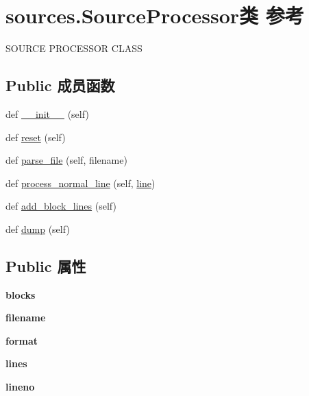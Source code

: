 \hypertarget{classsources_1_1_source_processor}{}\section{sources.\+Source\+Processor类 参考}
\label{classsources_1_1_source_processor}


S\+O\+U\+R\+CE P\+R\+O\+C\+E\+S\+S\+OR C\+L\+A\+SS  


\subsection*{Public 成员函数}
\begin{DoxyCompactItemize}
\item 
def \hyperlink{classsources_1_1_source_processor_a976a915b122b4e1eaae02ff140c04292}{\+\_\+\+\_\+init\+\_\+\+\_\+} (self)
\item 
def \hyperlink{classsources_1_1_source_processor_a367b849e7abce1219f2c14a9c8fda0ca}{reset} (self)
\item 
def \hyperlink{classsources_1_1_source_processor_ac3aa49eda144c4b855c84907d8f95c18}{parse\+\_\+file} (self, filename)
\item 
def \hyperlink{classsources_1_1_source_processor_a2b1c60d8bc9d94bb958e04019baafea3}{process\+\_\+normal\+\_\+line} (self, \hyperlink{structline}{line})
\item 
def \hyperlink{classsources_1_1_source_processor_a461735ab30867f32d3e974ee8f2c255d}{add\+\_\+block\+\_\+lines} (self)
\item 
def \hyperlink{classsources_1_1_source_processor_a4b76f5fe5374cca4929e6d4fb6eb0e1f}{dump} (self)
\end{DoxyCompactItemize}
\subsection*{Public 属性}
\begin{DoxyCompactItemize}
\item 
\mbox{\label{classsources_1_1_source_processor_a4c6a2a09b63a37de1c8f70d5cfd08bb1}} 
{\bfseries blocks}
\item 
\mbox{\label{classsources_1_1_source_processor_ab324c34e3a33bf2abec242df5407b690}} 
{\bfseries filename}
\item 
\mbox{\label{classsources_1_1_source_processor_a4613674ba9915139266f9a39a5d6295a}} 
{\bfseries format}
\item 
\mbox{\label{classsources_1_1_source_processor_adc4256e323f2766175075037a992a4f8}} 
{\bfseries lines}
\item 
\mbox{\label{classsources_1_1_source_processor_a3a18441a2fdf0feb1ac612f01263cee2}} 
{\bfseries lineno}
\end{DoxyCompactItemize}


